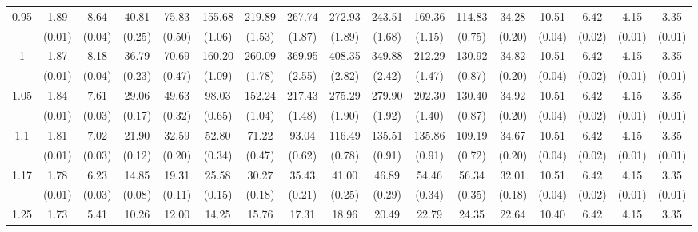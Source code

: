 \documentclass[12pt]{article}  %
\theoremstyle{plain}
\begin{document}
\begin{sidewaystable}[htbp]
\begin{tabular}{ccccccccccccccccc}
\multirow{2}{*}{0.95}  & 1.89& 8.64& 40.81& 75.83& 155.68& 219.89& 267.74& 272.93& 243.51 &169.36& 114.83& 34.28& 10.51 &6.42& 4.15 &3.35\\
                      & (0.01)& (0.04)& (0.25)& (0.50)& (1.06)& (1.53)& (1.87)& (1.89)& (1.68)&  (1.15)&  (0.75)&  (0.20)&  (0.04)&  (0.02)&  (0.01) &    (0.01)\\ \hline
\multirow{2}{*}{1}  & 1.87 &8.18 &36.79 &70.69 &160.20 &260.09& 369.95 &408.35 &349.88 &212.29 &130.92 &34.82 &10.51 &6.42 &4.15& 3.35\\
                      & (0.01)& (0.04)& (0.23)& (0.47)& (1.09)& (1.78)& (2.55)& (2.82)& (2.42)&  (1.47)&  (0.87)&  (0.20)&  (0.04)&  (0.02)&  (0.01)&     (0.01)\\ \hline                                                                     
\multirow{2}{*}{1.05}  &1.84 &7.61& 29.06 &49.63  &98.03& 152.24& 217.43 &275.29 &279.90 &202.30& 130.40& 34.92 &10.51 &6.42 &4.15& 3.35\\
                      & (0.01) &(0.03) &(0.17) &(0.32)& (0.65)& (1.04)& (1.48)& (1.90)& (1.92)&  (1.40)&  (0.87)&  (0.20)&  (0.04)&  (0.02)&  (0.01)&     (0.01)\\ \hline                                                                                                                                          
\multirow{2}{*}{1.1}  &1.81 &7.02 &21.90 &32.59 & 52.80 & 71.22 & 93.04 &116.49 &135.51& 135.86 &109.19 &34.67 &10.51 &6.42& 4.15& 3.35\\
                      &  (0.01)& (0.03)& (0.12)& (0.20)& (0.34)& (0.47)& (0.62)& (0.78)& (0.91)&  (0.91)&  (0.72)&  (0.20)&  (0.04)&  (0.02)&  (0.01)&     (0.01)\\ \hline
\multirow{2}{*}{1.17}  &1.78& 6.23 &14.85& 19.31 & 25.58 & 30.27 & 35.43 & 41.00 & 46.89 & 54.46 & 56.34& 32.01& 10.51& 6.42& 4.15& 3.35\\
                      &  (0.01)& (0.03)& (0.08)& (0.11)& (0.15)& (0.18)& (0.21)& (0.25)& (0.29)&  (0.34)&  (0.35)&  (0.18)&  (0.04)&  (0.02)&  (0.01)&     (0.01)\\ \hline                                                                                                                                                                                                                                                                                    
                                                                     \multirow{2}{*}{1.25}  &1.73 &5.41 &10.26& 12.00 & 14.25 & 15.76 & 17.31 & 18.96  &20.49 & 22.79  &24.35 &22.64 &10.40& 6.42 &4.15& 3.35\\

\end{tabular}
\end{sidewaystable}
\end{document}

